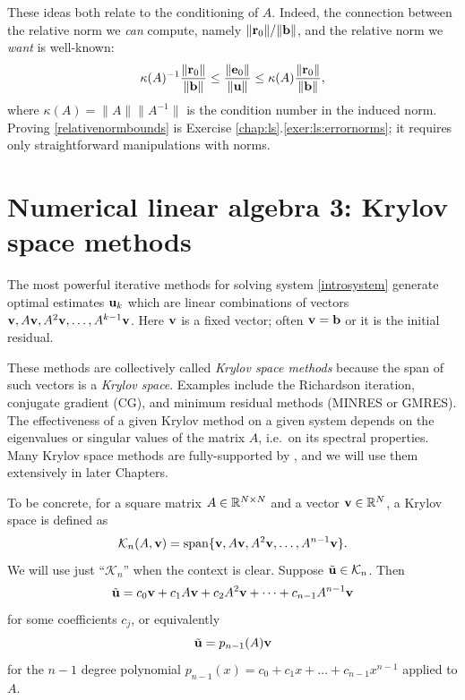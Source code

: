 These ideas both relate to the conditioning of $A$.  Indeed, the connection between the relative norm we \emph{can} compute, namely $\|\mathbf{r}_0\|/\|\mathbf{b}\|$, and the relative norm we \emph{want} is well-known:
\begin{equation}
\kappa(A)^{-1} \frac{\|\mathbf{r}_0\|}{\|\mathbf{b}\|} \le \frac{\|\mathbf{e}_0\|}{\|\mathbf{u}\|} \le \kappa(A) \frac{\|\mathbf{r}_0\|}{\|\mathbf{b}\|}, \label{relativenormbounds}
\end{equation}
where $\kappa(A) = \|A\| \|A^{-1}\|$ is the condition number in the induced norm.  Proving \eqref{relativenormbounds} is Exercise \ref{chap:ls}.\ref{exer:ls:errornorms}; it requires only straightforward manipulations with norms.


\section{Numerical linear algebra 3: Krylov space methods}

The most powerful iterative methods for solving system \eqref{introsystem} generate optimal estimates $\mathbf{u}_k$ which are linear combinations of vectors $\mathbf{v},A\mathbf{v},A^2\mathbf{v},\dots,A^{k-1}\mathbf{v}$.  Here $\mathbf{v}$ is a fixed vector; often $\mathbf{v}=\mathbf{b}$ or it is the initial residual.

These methods are collectively called \emph{Krylov space methods} because the span of such vectors is a \emph{Krylov space}.  Examples include the Richardson iteration, conjugate gradient (CG), and minimum residual methods (MINRES or GMRES).  The effectiveness of a given Krylov method on a given system depends on the eigenvalues or singular values of the matrix $A$, i.e.~on its spectral properties.  Many Krylov space methods are fully-supported by \PETSc, and we will use them extensively in later Chapters.

To be concrete, for a square matrix $A\in \mathbb{R}^{N\times N}$ and a vector $\mathbf{v}\in\mathbb{R}^N$, a Krylov space is defined as
\begin{equation}
    \mathcal{K}_n(A,\mathbf{v}) = \operatorname{span}\{\mathbf{v},A\mathbf{v},A^2\mathbf{v},\dots,A^{n-1}\mathbf{v}\}. \label{eq:ls:krylovdefn}
\end{equation}
We will use just ``$\mathcal{K}_n$'' when the context is clear.  Suppose $\tilde{\mathbf{u}} \in \mathcal{K}_n$.  Then
    $$\tilde{\mathbf{u}} = c_0 \mathbf{v} + c_1 A \mathbf{v} + c_2 A^2 \mathbf{v} + \dots + c_{n-1} A^{n-1} \mathbf{v}$$
for some coefficients $c_j$, or equivalently
    $$\tilde{\mathbf{u}} = p_{n-1}(A) \mathbf{v}$$
for the $n-1$ degree polynomial $p_{n-1}(x) = c_0 + c_1 x + \dots + c_{n-1} x^{n-1}$ applied to $A$.

